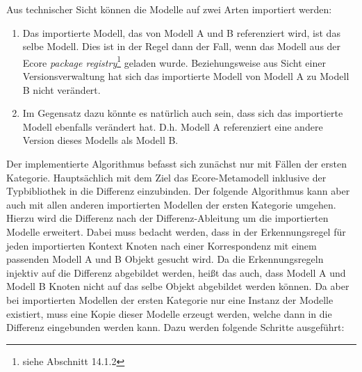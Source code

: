 Aus technischer Sicht können die Modelle auf zwei Arten importiert werden:
\begin{enumerate}
  \item Das importierte Modell, das von Modell A und B referenziert wird, ist das selbe Modell. Dies
  ist in der Regel dann der Fall, wenn das Modell aus der Ecore \textit{package
  registry}\footnote{siehe \cite{SBPM2009} Abschnitt 14.1.2} geladen wurde. Beziehungsweise aus Sicht einer
  Versionsverwaltung hat sich das importierte Modell von Modell A zu Modell B nicht verändert.
  
  \item Im Gegensatz dazu könnte es natürlich auch sein, dass sich das importierte Modell
  ebenfalls verändert hat. D.h. Modell A referenziert eine andere Version dieses Modells als
  Modell B.
\end{enumerate}
Der implementierte Algorithmus befasst sich zunächst nur mit Fällen der ersten Kategorie.
Hauptsächlich mit dem Ziel das Ecore-Metamodell inklusive der Typbibliothek in die Differenz
einzubinden. Der folgende Algorithmus kann aber auch mit allen anderen importierten Modellen der ersten
Kategorie umgehen. Hierzu wird die Differenz nach der Differenz-Ableitung um die importierten
Modelle erweitert. Dabei muss bedacht werden, dass in der Erkennungsregel für jeden importierten Kontext
Knoten nach einer Korrespondenz mit einem passenden Modell A und B Objekt gesucht wird. Da die
Erkennungsregeln injektiv auf die Differenz abgebildet werden, heißt das auch, dass Modell A und
Modell B Knoten nicht auf das selbe Objekt abgebildet werden können. Da aber bei importierten Modellen
der ersten Kategorie nur eine Instanz der Modelle existiert, muss eine Kopie dieser Modelle
erzeugt werden, welche dann in die Differenz eingebunden werden kann. Dazu werden folgende Schritte
ausgeführt:

